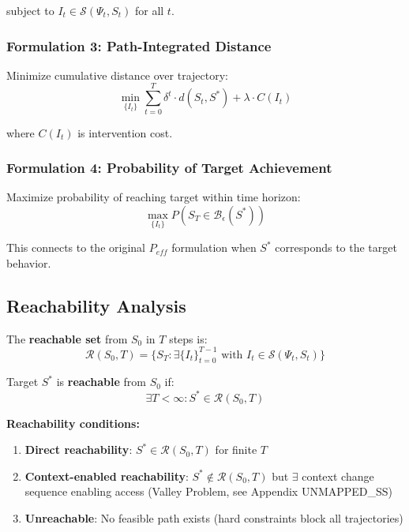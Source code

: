 subject to $I_t \in \mathcal{S}(\Psi_t, S_t)$ for all $t$.

\subsubsection{Formulation 3: Path-Integrated Distance}

Minimize cumulative distance over trajectory:
\begin{equation}
\boxed{
\min_{\{I_t\}} \sum_{t=0}^{T} \delta^t \cdot d(S_t, S^*) + \lambda \cdot C(I_t)
}
\label{eq:mp-path-integrated}
\end{equation}

where $C(I_t)$ is intervention cost.

\subsubsection{Formulation 4: Probability of Target Achievement}

Maximize probability of reaching target within time horizon:
\begin{equation}
\boxed{
\max_{\{I_t\}} P\left(S_T \in \mathcal{B}_\epsilon(S^*)\right)
}
\label{eq:mp-prob-target}
\end{equation}

This connects to the original $P_{eff}$ formulation when $S^*$ corresponds to the target behavior.

\subsection{Reachability Analysis}

\begin{definition}
The \textbf{reachable set} from $S_0$ in $T$ steps is:
\begin{equation}
\mathcal{R}(S_0, T) = \{S_T : \exists \{I_t\}_{t=0}^{T-1} \text{ with } I_t \in \mathcal{S}(\Psi_t, S_t)\}
\end{equation}
\end{definition}

\begin{definition}
Target $S^*$ is \textbf{reachable} from $S_0$ if:
\begin{equation}
\exists T < \infty : S^* \in \mathcal{R}(S_0, T)
\end{equation}
\end{definition}

\textbf{Reachability conditions:}
\begin{enumerate}
\item \textbf{Direct reachability}: $S^* \in \mathcal{R}(S_0, T)$ for finite $T$
\item \textbf{Context-enabled reachability}: $S^* \notin \mathcal{R}(S_0, T)$ but $\exists$ context change sequence enabling access (Valley Problem, see Appendix UNMAPPED_SS)
\item \textbf{Unreachable}: No feasible path exists (hard constraints block all trajectories)
\end{enumerate}

